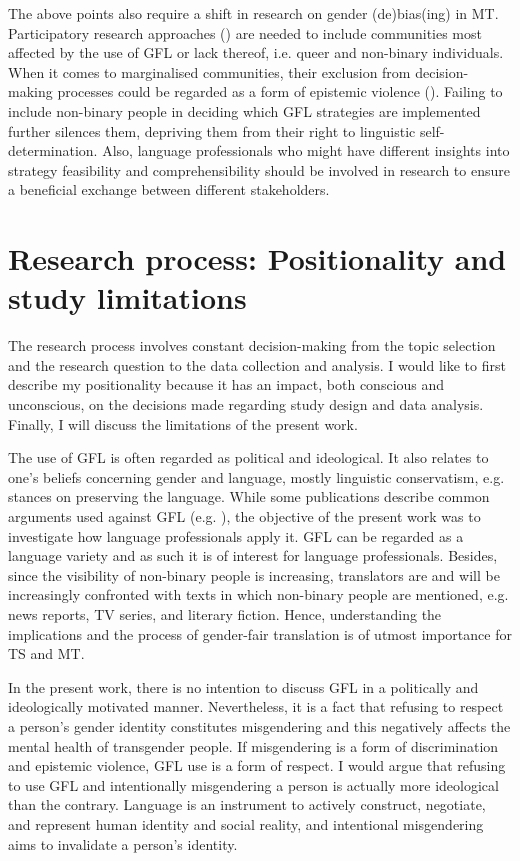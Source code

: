 The above points also require a shift in research on gender (de)bias(ing) in MT. Participatory research approaches (\cite{burtscher-2022-genderfairmt,gromann2023participatory}) are needed to include communities most affected by the use of GFL or lack thereof, i.e. queer and non-binary individuals. When it comes to marginalised communities, their exclusion from decision-making processes could be regarded as a form of epistemic violence (\cite{chakravarti1988can}). Failing to include non-binary people in deciding which GFL strategies are implemented further silences them, depriving them from their right to linguistic self-determination. Also, language professionals who might have different insights into strategy feasibility and comprehensibility should be involved in research to ensure a beneficial exchange between different stakeholders.

\section{Research process: Positionality and study limitations} \label{sec:limitations}

The research process involves constant decision-making from the topic selection and the research question to the data collection and analysis. I would like to first describe my positionality because it has an impact, both conscious and unconscious, on the decisions made regarding study design and data analysis. Finally, I will discuss the limitations of the present work. 

The use of GFL is often regarded as political and ideological. It also relates to one's beliefs concerning gender and language, mostly linguistic conservatism, e.g. stances on preserving the language. While some publications describe common arguments used against GFL (e.g. \cite{vergoossen2020four}), the objective of the present work was to investigate how language professionals apply it. GFL can be regarded as a language variety and as such it is of interest for language professionals. Besides, since the visibility of non-binary people is increasing, translators are and will be increasingly confronted with texts in which non-binary people are mentioned, e.g. news reports, TV series, and literary fiction. Hence, understanding the implications and the process of gender-fair translation is of utmost importance for TS and MT.

In the present work, there is no intention to discuss GFL in a politically and ideologically motivated manner. Nevertheless, it is a fact that refusing to respect a person's gender identity constitutes misgendering and this negatively affects the mental health of transgender people. If misgendering is a form of discrimination and epistemic violence, GFL use is a form of respect. I would argue that refusing to use GFL and intentionally misgendering a person is actually more ideological than the contrary. Language is an instrument to actively construct, negotiate, and represent human identity and social reality, and intentional misgendering aims to invalidate a person's identity.

